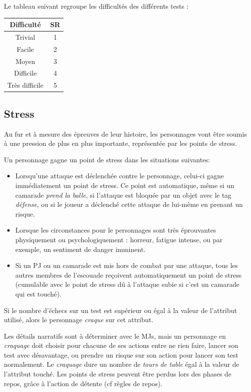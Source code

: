 \documentclass{report}
\begin{document}
\begin{multicols}{2}
Le tableau suivant regroupe les difficultés des différents tests :

\begin{center}
   \begin{tabular}{c|c}
    Difficulté & SR \\ \hline
    Trivial & 1\\
    Facile & 2\\
    Moyen & 3\\
    Difficile & 4\\
    Très difficile & 5
\end{tabular} 
\end{center}

\subsection{Stress}
Au fur et à mesure des épreuves de leur histoire, les personnages vont être soumis à une pression de plus en plus importante, représentée par les points de stress.

Un personnage gagne un point de stress dans les situations suivantes:
\begin{itemize}
    \item Lorsqu'une attaque est déclenchée contre le personnage, celui-ci gagne immédiatement un point de stress. Ce point est automatique, même si un camarade \emph{prend la balle}, si l'attaque est bloquée par un objet avec le tag \emph{défense}, ou si le joueur a déclenché cette attaque de lui-même en prenant un risque.
    \item Lorsque les circonstances pour le personnages sont très éprouvantes physiquement ou psychologiquement : horreur, fatigue intense, ou par exemple, un sentiment de danger imminent. %
    \item Si un PJ ou un camarade est mis hors de combat par une attaque, tous les autres membres de l'escouade reçoivent automatiquement un point de stress (cumulable avec le point de stress dû à l'attaque subie si c'est un camarade qui est touché).
\end{itemize}
Si le nombre d'échecs sur un test est supérieur ou égal à la valeur de l'attribut utilisé, alors le personnage \emph{craque} sur cet attribut.

Les détails narratifs sont à déterminer avec le MJs, mais un personnage en \emph{craquage} doit choisir pour chacune de ses actions entre ne rien faire, lancer son test avec désavantage, ou prendre un risque sur son action pour lancer son test normalement. Le \emph{craquage} dure un nombre de \emph{tours de table} égal à la valeur de l'attribut touché.
Les points de stress peuvent être perdus lors des phases de repos, grâce à l'action de détente (cf règles de repos).



\end{multicols}
\end{document}
